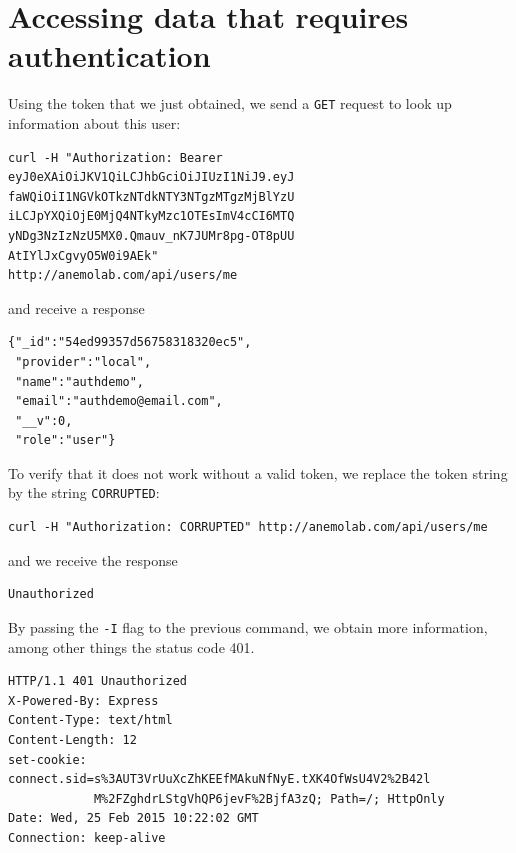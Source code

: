 \documentclass{article}
\begin{document}
\section{Accessing data that requires authentication}
Using the token that we just obtained, we send a \texttt{GET} request to look up information about this user:
\begin{verbatim}
curl -H "Authorization: Bearer 
eyJ0eXAiOiJKV1QiLCJhbGciOiJIUzI1NiJ9.eyJ
faWQiOiI1NGVkOTkzNTdkNTY3NTgzMTgzMjBlYzU
iLCJpYXQiOjE0MjQ4NTkyMzc1OTEsImV4cCI6MTQ
yNDg3NzIzNzU5MX0.Qmauv_nK7JUMr8pg-OT8pUU
AtIYlJxCgvyO5W0i9AEk" 
http://anemolab.com/api/users/me
\end{verbatim}
and receive a response
\begin{verbatim}
{"_id":"54ed99357d56758318320ec5",
 "provider":"local",
 "name":"authdemo",
 "email":"authdemo@email.com",
 "__v":0,
 "role":"user"}
\end{verbatim}
To verify that it does not work without a valid token, we replace the token string by the string \texttt{CORRUPTED}:
\begin{verbatim}
curl -H "Authorization: CORRUPTED" http://anemolab.com/api/users/me
\end{verbatim}
and we receive the response
\begin{verbatim}
Unauthorized
\end{verbatim}
By passing the \texttt{-I} flag to the previous command, we obtain more information, among other things the status code 401.
\begin{verbatim}
HTTP/1.1 401 Unauthorized
X-Powered-By: Express
Content-Type: text/html
Content-Length: 12
set-cookie: connect.sid=s%3AUT3VrUuXcZhKEEfMAkuNfNyE.tXK4OfWsU4V2%2B42l
            M%2FZghdrLStgVhQP6jevF%2BjfA3zQ; Path=/; HttpOnly
Date: Wed, 25 Feb 2015 10:22:02 GMT
Connection: keep-alive
\end{verbatim}
\end{document}
